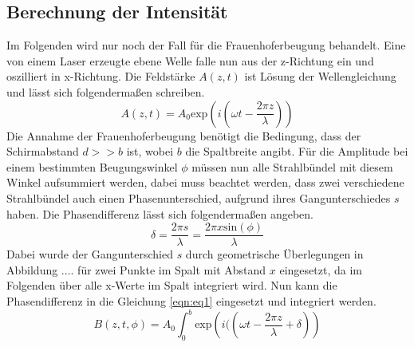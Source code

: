 \subsection{Berechnung der Intensität}
Im Folgenden wird nur noch der Fall für die Frauenhoferbeugung behandelt. 
Eine von einem Laser erzeugte ebene Welle falle nun aus der z-Richtung ein und oszilliert in x-Richtung. Die Feldstärke $A(z,t)$ ist Lösung der Wellengleichung und lässt sich folgendermaßen schreiben.
\begin{equation}
    \label{eqn:eq1}
   A(z,t)  = A_{0} \text{exp}\left(i\left(\omega t - \frac{2\pi z}{\lambda} \right)\right)
\end{equation}
 Die Annahme der Frauenhoferbeugung benötigt die Bedingung, dass der Schirmabstand $d >> b$ ist, wobei $b$ die Spaltbreite angibt. Für die Amplitude bei einem bestimmten Beugungswinkel $\phi$ müssen nun alle Strahlbündel mit diesem Winkel aufsummiert werden, dabei muss beachtet werden, dass zwei verschiedene Strahlbündel auch einen Phasenunterschied, aufgrund ihres Gangunterschiedes $s$ haben. Die Phasendifferenz lässt sich folgendermaßen angeben.
 \begin{equation}
     \delta = \frac{2\pi s}{\lambda} = \frac{2\pi x \text{sin}(\phi) }{\lambda}
 \end{equation}
 Dabei wurde der Gangunterschied $s$ durch geometrische Überlegungen in Abbildung .... für zwei Punkte im Spalt mit Abstand $x$ eingesetzt, da im Folgenden über alle x-Werte im Spalt integriert wird.
Nun kann die Phasendifferenz in die Gleichung \eqref{eqn:eq1} eingesetzt und integriert werden.
\begin{equation}
B(z, t, \phi) =  A_{0} \int_{0}^{b} \text{exp} \left( i(\left( \omega t - \frac{2\pi z}{\lambda} + \delta\right)\right)
\end{equation}
